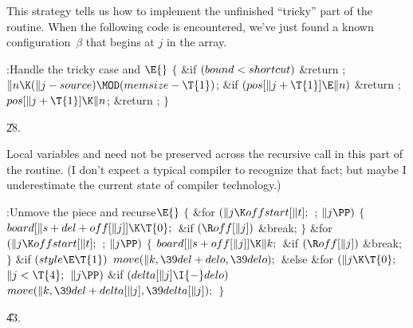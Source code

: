 This strategy tells us how to implement the unfinished ``tricky'' part
of the  routine. When the following code is encountered, we've
just
found a known configuration~$\beta$ that begins at $j$ in the 
array.

\Y\B\4:Handle the tricky case and \X${}\E{}$\6
${}\{{}$\1\6
\&{if} ${}(\\{bound}<\\{shortcut}){}$\1\5
\&{return} ;\2\6
${}\|n\K(\|j-\\{source})\MOD(\\{memsize}-\T{1}){}$;\6
\&{if} ${}(\\{pos}[\|j+\T{1}]\E\|n){}$\1\5
\&{return} ;\2\6
${}\\{pos}[\|j+\T{1}]\K\|n{}$;\6
\&{return} ;\6
\4${}\}{}$\2\par
\U28.\fi

Local variables  and  need not be preserved across the
recursive
call in this part of the  routine. (I don't expect a typical
compiler
to recognize that fact; but maybe I underestimate the current state
of compiler technology.)

\Y\B\4:Unmove the piece and recurse\X${}\E{}$\6
${}\{{}$\1\6
\&{for} ${}(\|j\K\\{offstart}[\|t];{}$  ; ${}\|j\PP){}$\5
${}\{{}$\1\6
${}\\{board}[\|s+\\{del}+\\{off}[\|j]]\K\T{0};{}$\6
\&{if} ${}(\R\\{off}[\|j]){}$\1\5
\&{break};\2\6
\4${}\}{}$\2\6
\&{for} ${}(\|j\K\\{offstart}[\|t];{}$  ; ${}\|j\PP){}$\5
${}\{{}$\1\6
${}\\{board}[\|s+\\{off}[\|j]]\K\|k;{}$\6
\&{if} ${}(\R\\{off}[\|j]){}$\1\5
\&{break};\2\6
\4${}\}{}$\2\6
\&{if} ${}(\\{style}\E\T{1}){}$\1\5
${}\\{move}(\|k,\39\\{del}+\\{delo},\39\\{delo});{}$\2\6
\&{else}\1\6
\&{for} ${}(\|j\K\T{0};{}$ ${}\|j<\T{4};{}$ ${}\|j\PP){}$\1\6
\&{if} ${}(\\{delta}[\|j]\I{-}\\{delo}){}$\1\5
${}\\{move}(\|k,\39\\{del}+\\{delta}[\|j],\39\\{delta}[\|j]);{}$\2\2\2\6
\4${}\}{}$\2\par
\U43.\fi

